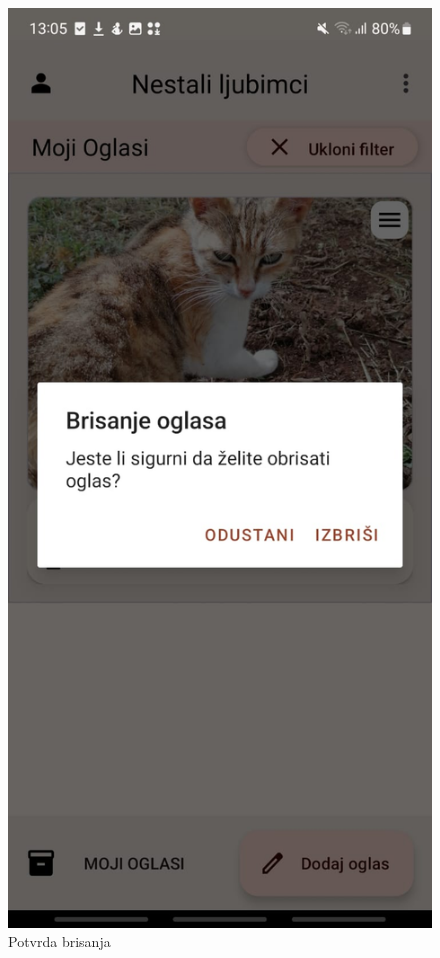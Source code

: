 \begin{figure}[H]
\begin{minipage}{.5\textwidth}
				  \centering
				  \includegraphics[width=.58\linewidth]{slike/app4v2.jpg}
				  \caption{Potvrda brisanja}
				  \label{fig:app4v2}
			\end{minipage}
			\end{figure}
